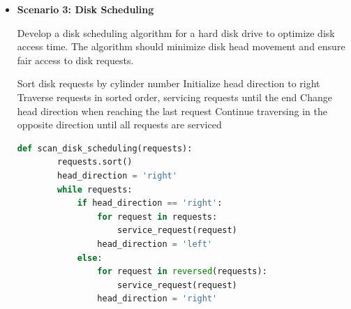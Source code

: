 \documentclass[12pt]{book} %
\begin{document}
\begin{itemize}
    Your task is to develop a real-time task scheduling algorithm for an embedded system. The system has multiple tasks with different execution times and deadlines. Design an algorithm that meets all task deadlines while maximizing system throughput.
    
    \begin{algorithm}[H]
        \caption{Rate-Monotonic Scheduling}
        \begin{algorithmic}[1]
            \State Sort tasks by their periods in ascending order
            \State Assign priorities to tasks based on their periods (shorter periods have higher priorities)
            \State Execute tasks in order of priority, preempting lower-priority tasks if necessary
            \EndProcedure
        \end{algorithmic}
    \end{algorithm}
    
    \FloatBarrier
    \begin{lstlisting}[language=Python, caption=Python Implementation of Rate-Monotonic Scheduling Algorithm]
    def rate_monotonic_scheduling(tasks):
        tasks.sort(key=lambda x: x.period)
        for task in tasks:
            execute_task(task)
    \end{lstlisting}
    \FloatBarrier
    
    \item \textbf{Scenario 3: Disk Scheduling}
    
    Develop a disk scheduling algorithm for a hard disk drive to optimize disk access time. The algorithm should minimize disk head movement and ensure fair access to disk requests.
    
    \begin{algorithm}[H]
        \caption{SCAN (Elevator) Disk Scheduling}
        \begin{algorithmic}[1]
            \State Sort disk requests by cylinder number
            \State Initialize head direction to right
            \State Traverse requests in sorted order, servicing requests until the end
            \State Change head direction when reaching the last request
            \State Continue traversing in the opposite direction until all requests are serviced
            \EndProcedure
        \end{algorithmic}
    \end{algorithm}
    
    \FloatBarrier
    \begin{lstlisting}[language=Python, caption=Python Implementation of SCAN Disk Scheduling Algorithm]
    def scan_disk_scheduling(requests):
        requests.sort()
        head_direction = 'right'
        while requests:
            if head_direction == 'right':
                for request in requests:
                    service_request(request)
                head_direction = 'left'
            else:
                for request in reversed(requests):
                    service_request(request)
                head_direction = 'right'
        \end{lstlisting}
    \FloatBarrier
\end{itemize}
\end{document}
